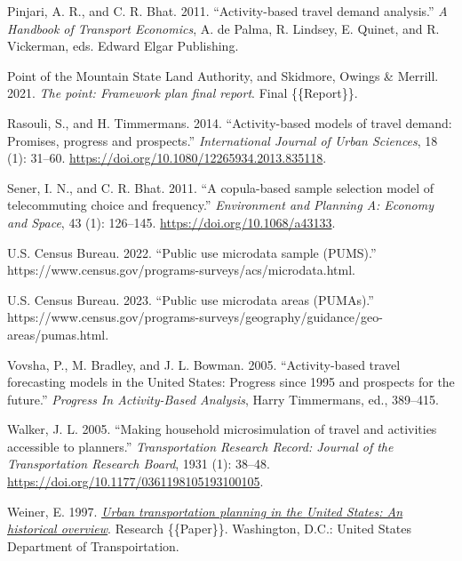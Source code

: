\documentclass[fancy, twoside, mastersfancy, ms]{byuthesis}
\newlength{\cslhangindent}
\newenvironment{CSLReferences}[2] %
 {\begin{list}{}{%
  \setlength{\itemindent}{0pt}
  \setlength{\leftmargin}{0pt}
  \setlength{\parsep}{0pt}
  \ifodd #1
   \setlength{\leftmargin}{\cslhangindent}
   \setlength{\itemindent}{-1\cslhangindent}
  \fi
  \setlength{\itemsep}{#2\baselineskip}}}
 {\end{list}}
\begin{document}
\begin{CSLReferences}{1}{0}
Pinjari, A. R., and C. R. Bhat. 2011. {``Activity-based travel demand
analysis.''} \emph{A {Handbook} of {Transport Economics}}, A. de Palma,
R. Lindsey, E. Quinet, and R. Vickerman, eds. Edward Elgar Publishing.

Point of the Mountain State Land Authority, and Skidmore, Owings \&
Merrill. 2021. \emph{The point: Framework plan final report}. Final
\{\{Report\}\}.

Rasouli, S., and H. Timmermans. 2014. {``Activity-based models of travel
demand: Promises, progress and prospects.''} \emph{International Journal
of Urban Sciences}, 18 (1): 31--60.
\url{https://doi.org/10.1080/12265934.2013.835118}.

Sener, I. N., and C. R. Bhat. 2011. {``A copula-based sample selection
model of telecommuting choice and frequency.''} \emph{Environment and
Planning A: Economy and Space}, 43 (1): 126--145.
\url{https://doi.org/10.1068/a43133}.

U.S. Census Bureau. 2022. {``Public use microdata sample ({PUMS}).''}
https://www.census.gov/programs-surveys/acs/microdata.html.

U.S. Census Bureau. 2023. {``Public use microdata areas ({PUMAs}).''}
https://www.census.gov/programs-surveys/geography/guidance/geo-areas/pumas.html.

Vovsha, P., M. Bradley, and J. L. Bowman. 2005. {``Activity-based travel
forecasting models in the {United States}: Progress since 1995 and
prospects for the future.''} \emph{Progress {In Activity-Based
Analysis}}, Harry Timmermans, ed., 389--415.

Walker, J. L. 2005. {``Making household microsimulation of travel and
activities accessible to planners.''} \emph{Transportation Research
Record: Journal of the Transportation Research Board}, 1931 (1): 38--48.
\url{https://doi.org/10.1177/0361198105193100105}.

Weiner, E. 1997. \emph{\href{https://doi.org/10.21949/1526591}{Urban
transportation planning in the {United States}: An historical
overview}}. Research \{\{Paper\}\}. Washington, D.C.: United States
Department of Transpoirtation.


\end{CSLReferences}
\end{document}
